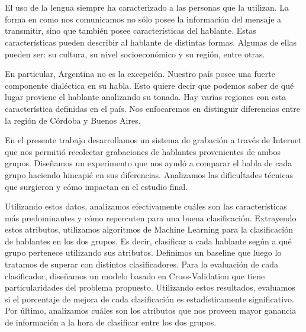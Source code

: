 \chapter*{\runtitulo}

\noindent 

El uso de la lengua siempre ha caracterizado a las personas que la utilizan. La forma en como nos comunicamos no sólo posee la información del mensaje a transmitir, sino que también posee características del hablante. Estas características pueden describir al hablante de distintas formas. Algunas de ellas pueden ser: su cultura, su nivel socioeconómico y su región, entre otras.
 
En particular, Argentina no es la excepción. Nuestro país posee una fuerte componente dialéctica en su habla. Esto quiere decir que podemos saber de qué lugar proviene el hablante analizando su tonada. Hay varias regiones con esta característica definidas en el país. Nos enfocaremos en distinguir diferencias entre la región de Córdoba y Buenos Aires.


En el presente trabajo desarrollamos un sistema de grabación a través de Internet que nos permitió recolectar grabaciones de hablantes provenientes de ambos grupos. Diseñamos un experimento que nos ayudó a comparar el habla de cada grupo haciendo hincapié en sus diferencias. Analizamos las dificultades técnicas que surgieron y cómo impactan en el estudio final.

Utilizando estos datos, analizamos efectivamente cuáles son las características más predominantes y cómo repercuten para una buena clasificación. Extrayendo estos atributos, utilizamos algoritmos de Machine Learning para la clasificación de hablantes en los dos grupos. Es decir, clasificar a cada hablante según a qué grupo pertenece utilizando sus atributos. Definimos un baseline que luego lo tratamos de superar con distintos clasificadores. Para la evaluación de cada clasificador, diseñamos un modelo basado en Cross-Validation que tiene particularidades del problema propuesto. Utilizando estos resultados, evaluamos si el porcentaje de mejora de cada clasificación es estadísticamente significativo. Por último, analizamos cuáles son los atributos que nos proveen mayor ganancia de información a la hora de clasificar entre los dos grupos.

